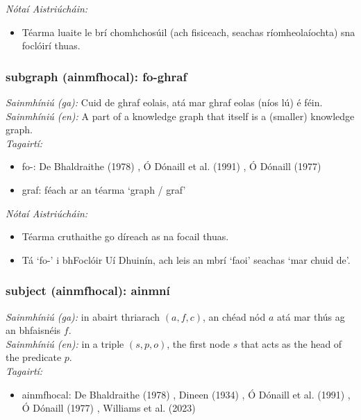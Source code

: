  \noindent \textit{Nótaí Aistriúcháin:}
\begin{itemize}
	\item Téarma luaite le brí chomhchosúil (ach fisiceach, seachas ríomheolaíochta) sna foclóirí thuas.
\end{itemize}


\subsubsection*{subgraph (ainmfhocal): fo-ghraf}
 \noindent \textit{Sainmhíniú (ga):} Cuid de ghraf eolais, atá mar ghraf eolas (níos lú) é féin.
\\
 \noindent \textit{Sainmhíniú (en):} A part of a knowledge graph that itself is a (smaller) knowledge graph.
\\
 \noindent \textit{Tagairtí:}
\begin{itemize}
	\item fo-: De Bhaldraithe (1978) \cite{de-bhaldraithe}, Ó Dónaill et al. (1991) \cite{focloir-beag}, Ó Dónaill (1977) \cite{odonaill}
	\item graf: féach ar an téarma `graph / graf'
\end{itemize}

 \noindent \textit{Nótaí Aistriúcháin:}
\begin{itemize}
	\item Téarma cruthaithe go díreach as na focail thuas.
	\item Tá `fo-' i bhFoclóir Uí Dhuinín, ach leis an mbrí `faoi' seachas `mar chuid de'.
\end{itemize}


\subsubsection*{subject (ainmfhocal): ainmní}
 \noindent \textit{Sainmhíniú (ga):} in abairt thriarach $(a,f,c)$, an chéad nód $a$ atá mar thús ag an bhfaisnéis $f$.
\\
 \noindent \textit{Sainmhíniú (en):} in a triple $(s,p,o)$, the first node $s$ that acts as the head of the predicate $p$.
\\
 \noindent \textit{Tagairtí:}
\begin{itemize}
	\item ainmfhocal: De Bhaldraithe (1978) \cite{de-bhaldraithe}, Dineen (1934) \cite{dineen}, Ó Dónaill et al. (1991) \cite{focloir-beag}, Ó Dónaill (1977) \cite{odonaill}, Williams et al. (2023) \cite{storchiste}
\end{itemize}

